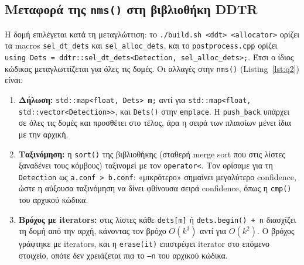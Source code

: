 \documentclass[11pt,a4paper]{article}
\newcommand{\en}[1]{\textlatin{#1}}
\begin{document}
\subsection{Μεταφορά της \en{\texttt{nms()}} στη βιβλιοθήκη \en{DDTR}}
Η δομή επιλέγεται κατά τη μεταγλώττιση: το \en{\texttt{./build.sh <ddt> <allocator>}} ορίζει τα \en{macros} \en{\texttt{sel\_dt\_dets}} και \en{\texttt{sel\_alloc\_dets}}, και το \en{\texttt{postprocess.cpp}} ορίζει \en{\texttt{using Dets = ddtr::sel\_dt\_dets<Detection, sel\_alloc\_dets>;}}. Έτσι ο ίδιος κώδικας μεταγλωττίζεται για όλες τις δομές. Οι αλλαγές στην \en{\texttt{nms()}} (\en{Listing}~\ref{lst:q2}) είναι:
\begin{enumerate}
    \item \textbf{Δήλωση:} \en{\texttt{std::map<float, Dets> m;}} αντί για \en{\texttt{std::map<float, std::vector<Detection>>}}, και \en{\texttt{Dets()}} στην \en{\texttt{emplace}}. Η \en{\texttt{push\_back}} υπάρχει σε όλες τις δομές και προσθέτει στο τέλος, άρα η σειρά των πλαισίων μένει ίδια με την αρχική.
    \item \textbf{Ταξινόμηση:} η \en{\texttt{sort()}} της βιβλιοθήκης (σταθερή \en{merge sort} που στις λίστες ξαναδένει τους κόμβους) ταξινομεί με τον \en{\texttt{operator<}}. Τον ορίσαμε για τη \en{\texttt{Detection}} ως \en{\texttt{a.conf > b.conf}}: «μικρότερο» σημαίνει μεγαλύτερο \en{confidence}, ώστε η αύξουσα ταξινόμηση να δίνει φθίνουσα σειρά \en{confidence}, όπως η \en{\texttt{cmp()}} του αρχικού κώδικα.
    \item \textbf{Βρόχος με \en{iterators}:} στις λίστες κάθε \en{\texttt{dets[m]}} ή \en{\texttt{dets.begin() + n}} διασχίζει τη δομή από την αρχή, κάνοντας τον βρόχο $O(k^3)$ αντί για $O(k^2)$. Ο βρόχος γράφτηκε με \en{iterators}, και η \en{\texttt{erase(it)}} επιστρέφει \en{iterator} στο επόμενο στοιχείο, οπότε δεν χρειάζεται πια το \en{\texttt{--n}} του αρχικού κώδικα.
\end{enumerate}
\end{document}
